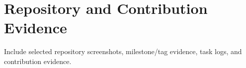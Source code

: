 \chapter{Repository and Contribution Evidence}
Include selected repository screenshots, milestone/tag evidence, task logs, and contribution evidence.
